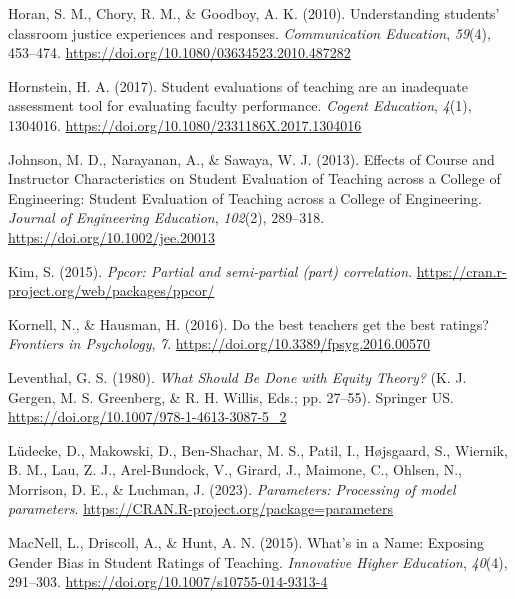 \documentclass[
  man]{apa7}
\newlength{\cslhangindent}
\newlength{\cslentryspacingunit} %
\newenvironment{CSLReferences}[2] %
 {%
  \setlength{\parindent}{0pt}
  \ifodd #1
  \let\oldpar\par
  \def\par{\hangindent=\cslhangindent\oldpar}
  \fi
  \setlength{\parskip}{#2\cslentryspacingunit}
 }%
 {}
\begin{document}
\begin{CSLReferences}{1}{0}
\leavevmode{}%
Horan, S. M., Chory, R. M., \& Goodboy, A. K. (2010). Understanding students' classroom justice experiences and responses. \emph{Communication Education}, \emph{59}(4), 453--474. \url{https://doi.org/10.1080/03634523.2010.487282}

\leavevmode{}%
Hornstein, H. A. (2017). Student evaluations of teaching are an inadequate assessment tool for evaluating faculty performance. \emph{Cogent Education}, \emph{4}(1), 1304016. \url{https://doi.org/10.1080/2331186X.2017.1304016}

\leavevmode{}%
Johnson, M. D., Narayanan, A., \& Sawaya, W. J. (2013). Effects of Course and Instructor Characteristics on Student Evaluation of Teaching across a College of Engineering: Student Evaluation of Teaching across a College of Engineering. \emph{Journal of Engineering Education}, \emph{102}(2), 289--318. \url{https://doi.org/10.1002/jee.20013}

\leavevmode{}%
Kim, S. (2015). \emph{Ppcor: Partial and semi-partial (part) correlation}. \url{https://cran.r-project.org/web/packages/ppcor/}

\leavevmode{}%
Kornell, N., \& Hausman, H. (2016). Do the best teachers get the best ratings? \emph{Frontiers in Psychology}, \emph{7}. \url{https://doi.org/10.3389/fpsyg.2016.00570}

\leavevmode{}%
Leventhal, G. S. (1980). \emph{What Should Be Done with Equity Theory?} (K. J. Gergen, M. S. Greenberg, \& R. H. Willis, Eds.; pp. 27--55). Springer US. \url{https://doi.org/10.1007/978-1-4613-3087-5_2}

\leavevmode{}%
Lüdecke, D., Makowski, D., Ben-Shachar, M. S., Patil, I., Højsgaard, S., Wiernik, B. M., Lau, Z. J., Arel-Bundock, V., Girard, J., Maimone, C., Ohlsen, N., Morrison, D. E., \& Luchman, J. (2023). \emph{Parameters: Processing of model parameters}. \url{https://CRAN.R-project.org/package=parameters}

\leavevmode{}%
MacNell, L., Driscoll, A., \& Hunt, A. N. (2015). What{'}s in a Name: Exposing Gender Bias in Student Ratings of Teaching. \emph{Innovative Higher Education}, \emph{40}(4), 291--303. \url{https://doi.org/10.1007/s10755-014-9313-4}


\end{CSLReferences}
\end{document}
